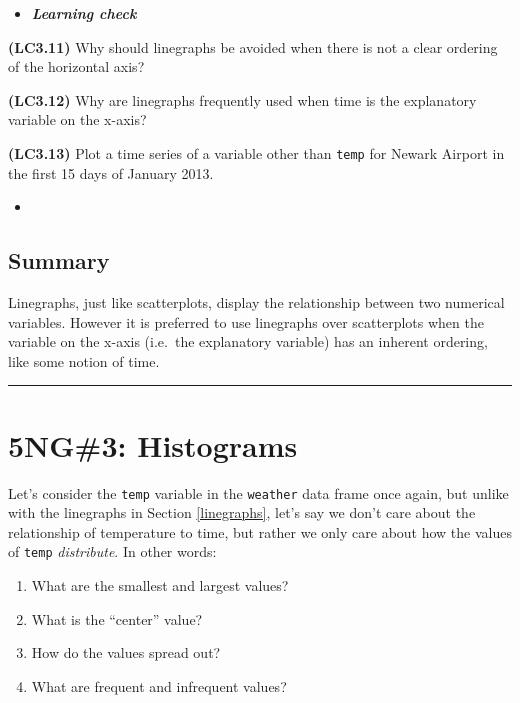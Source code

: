 \documentclass[12pt, krantz2,]{krantz}
\providecommand{\tightlist}{%
  \setlength{\itemsep}{0pt}\setlength{\parskip}{0pt}}
\newenvironment{rmdblock}[1]
  {\begin{shaded*}
  \begin{itemize}
  \renewcommand{\labelitemi}{
    \raisebox{-.7\height}[0pt][0pt]{
    }
  }
  \item
  }
  {
  \end{itemize}
  \end{shaded*}
  }
\newenvironment{learncheck}
  {\begin{rmdblock}{warning}}
  {\end{rmdblock}}
\begin{document}
\begin{learncheck}
\textbf{\emph{Learning check}}
\end{learncheck}

\textbf{(LC3.11)} Why should linegraphs be avoided when there is not a clear ordering of the horizontal axis?

\textbf{(LC3.12)} Why are linegraphs frequently used when time is the explanatory variable on the x-axis?

\textbf{(LC3.13)} Plot a time series of a variable other than \texttt{temp} for Newark Airport in the first 15 days of January 2013.

\begin{learncheck}

\end{learncheck}

\hypertarget{summary-1}{%
\subsection{Summary}\label{summary-1}}

Linegraphs, just like scatterplots, display the relationship between two numerical variables. However it is preferred to use linegraphs over scatterplots when the variable on the x-axis (i.e.~the explanatory variable) has an inherent ordering, like some notion of time.

\begin{center}\rule{0.5\linewidth}{\linethickness}\end{center}

\hypertarget{histograms}{%
\section{5NG\#3: Histograms}\label{histograms}}

Let's consider the \texttt{temp} variable in the \texttt{weather} data frame once again, but unlike with the linegraphs in Section \ref{linegraphs}, let's say we don't care about the relationship of temperature to time, but rather we only care about how the values of \texttt{temp} \emph{distribute}. In other words:

\begin{enumerate}
\def\labelenumi{\arabic{enumi}.}
\tightlist
\item
  What are the smallest and largest values?
\item
  What is the ``center'' value?
\item
  How do the values spread out?
\item
  What are frequent and infrequent values?
\end{enumerate}
\end{document}
